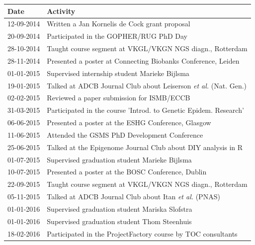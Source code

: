 \begin{appendices}
	\begin{table}
		\footnotesize
		\begin{tabulary}{\linewidth}{LL}
			Date & Activity \\
			\hline
			\rule{0pt}{2.5ex}\mbox{12-09-2014} & Written a Jan Kornelis de Cock grant proposal \\
			\rule{0pt}{2.5ex}\mbox{20-09-2014} & Participated in the GOPHER/RUG PhD Day \\
			\rule{0pt}{2.5ex}\mbox{28-10-2014} & Taught course segment at VKGL/VKGN NGS diagn., Rotterdam \\
			\rule{0pt}{2.5ex}\mbox{28-11-2014} & Presented a poster at Connecting Biobanks Conference, Leiden \\
			\rule{0pt}{2.5ex}\mbox{01-01-2015} & Supervised internship student Marieke Bijlsma \\
			\rule{0pt}{2.5ex}\mbox{19-01-2015} & Talked at ADCB Journal Club about Leiserson \textsl{et al.} (Nat. Gen.) \\
			\rule{0pt}{2.5ex}\mbox{02-02-2015} & Reviewed a paper submission for ISMB/ECCB \\
			\rule{0pt}{2.5ex}\mbox{31-03-2015} & Participated in the course 'Introd. to Genetic Epidem. Research' \\
			\rule{0pt}{2.5ex}\mbox{06-06-2015} & Presented a poster at the ESHG Conference, Glasgow \\
			\rule{0pt}{2.5ex}\mbox{11-06-2015} & Attended the GSMS PhD Development Conference \\
			\rule{0pt}{2.5ex}\mbox{25-06-2015} & Talked at the Epigenome Journal Club about DIY analysis in R \\
			\rule{0pt}{2.5ex}\mbox{01-07-2015} & Supervised graduation student Marieke Bijlsma \\
			\rule{0pt}{2.5ex}\mbox{10-07-2015} & Presented a poster at the BOSC Conference, Dublin \\
			\rule{0pt}{2.5ex}\mbox{22-09-2015} & Taught course segment at VKGL/VKGN NGS diagn., Rotterdam \\
			\rule{0pt}{2.5ex}\mbox{05-11-2015} & Talked at ADCB Journal Club about Itan \textsl{et al.} (PNAS) \\
			\rule{0pt}{2.5ex}\mbox{01-01-2016} & Supervised graduation student Mariska Slofstra \\
			\rule{0pt}{2.5ex}\mbox{01-01-2016} & Supervised graduation student Thom Steenhuis \\
			\rule{0pt}{2.5ex}\mbox{18-02-2016} & Participated in the ProjectFactory course by TOC consultants \\

\end{tabulary}
\end{table}
\end{appendices}

